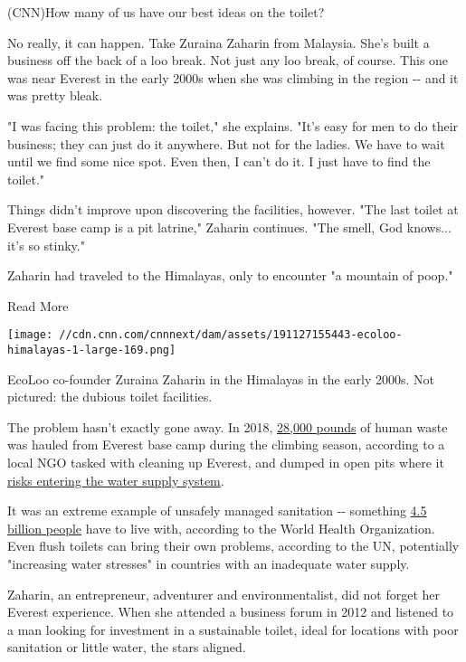 (CNN)How many of us have our best ideas on the toilet?

No really, it can happen. Take Zuraina Zaharin from Malaysia. She's
built a business off the back of a loo break. Not just any loo break, of
course. This one was near Everest in the early 2000s when she was
climbing in the region -\/- and it was pretty bleak.

"I was facing this problem: the toilet," she explains. "It's easy for
men to do their business; they can just do it anywhere. But not for the
ladies. We have to wait until we find some nice spot. Even then, I can't
do it. I just have to find the toilet."

Things didn't improve upon discovering the facilities, however. "The
last toilet at Everest base camp is a pit latrine," Zaharin continues.
"The smell, God knows... it's so stinky."

Zaharin had traveled to the Himalayas, only to encounter "a mountain of
poop."

Read More

\texttt{[image: //cdn.cnn.com/cnnnext/dam/assets/191127155443-ecoloo-himalayas-1-large-169.png]}

EcoLoo co-founder Zuraina Zaharin in the Himalayas in the early 2000s.
Not pictured: the dubious toilet facilities.

The problem hasn't exactly gone away. In 2018,
\href{https://cnn.com/2018/08/05/health/mount-everest-biogas-project/index.html}{28,000
pounds} of human waste was hauled from Everest base camp during the
climbing season, according to a local NGO tasked with cleaning up
Everest, and dumped in open pits where it
\href{https://www.summitclimb.com/news/mef/everest-water-pollution-news/}{risks
entering the water supply system}.

It was an extreme example of unsafely managed sanitation -\/- something
\href{https://www.who.int/news-room/detail/12-07-2017-2-1-billion-people-lack-safe-drinking-water-at-home-more-than-twice-as-many-lack-safe-sanitation}{4.5
billion people} have to live with, according to the World Health
Organization. Even flush toilets can bring their own problems, according
to the UN, potentially "increasing water stresses" in countries with an
inadequate water supply.

Zaharin, an entrepreneur, adventurer and environmentalist, did not
forget her Everest experience. When she attended a business forum in
2012 and listened to a man looking for investment in a sustainable
toilet, ideal for locations with poor sanitation or little water, the
stars aligned.

